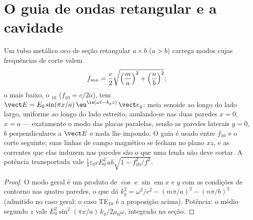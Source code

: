 \section{O guia de ondas retangular e a cavidade}

\begin{proposition}\label{prop:b2:guided-waves:rectangular}
Um tubo metálico oco de seção retangular $a \times b$ ($a > b$) carrega
modos cujas frequências de corte valem
\[
f_{mn} = \frac c2\sqrt{\Bigl(\frac ma\Bigr)^2 + \Bigl(\frac nb\Bigr)^2} ;
\]
o mais baixo, o \emph{$_{10}$} ($f_{10} = c/2a$), tem $\vect E = E_0\sin
(\pi x/a)\,\eu^{\iu(\omega t - k_gz)}\,\vect e_y$: meia senoide ao longo do lado
largo, uniforme ao longo do lado estreito, anulando-se nas duas paredes $x = 0$,
$x = a$ --- exatamente o modo das placas paralelas, sendo as paredes laterais $y = 0$, $b$
perpendiculares a $\vect E$ e nada lhe impondo. O guia é
usado entre $f_{10}$ e o corte seguinte; suas linhas de campo magnético
se fecham no plano $xz$, e as correntes que elas induzem nas paredes são
o que uma fenda não deve cortar. A potência transportada vale $\tfrac14\varepsilon_0cE_0^2\,ab
\sqrt{1 - f_{10}^2/f^2}$.
\end{proposition}

\begin{proof}
O modo geral é um produto de $\cos$ e $\sin$ em $x$ e $y$ com as
condições de contorno nas quatro paredes, o que dá $k_g^2 = \omega^2/c^2 - (m\pi/a)^2
- (n\pi/b)^2$ (admitido no caso geral; o caso TE$_{10}$ é a proposição
acima). Potência: o  médio segundo $z$ vale $E_0^2\sin^2(\pi x/a)
\,k_g/2\mu_0\omega$, integrado na seção.
\end{proof}

